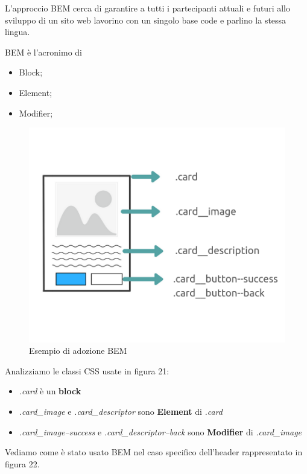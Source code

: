 L'approccio BEM cerca di garantire a tutti i partecipanti attuali e futuri allo sviluppo di un sito web
lavorino con un singolo base code e parlino la stessa lingua. 

BEM è l'acronimo di 
\begin{itemize}
\item Block;
\item Element;
\item Modifier;
\end{itemize}

\begin{figure}[H]
    \centering  
    \caption{Esempio di adozione BEM}
    \includegraphics[scale=0.5]{img/cap3/bem-1}
\end{figure}

Analizziamo le classi CSS usate in figura 21:

\begin{itemize}
    \item \textit{.card} è un \textbf{block}
    \item \textit{.card{\_}image} e  \textit{.card{\_}descriptor} sono \textbf{Element} di \textit{.card}
    \item \textit{.card{\_}image--success} e  \textit{.card{\_}descriptor--back} sono 
    \textbf{Modifier} di \textit{.card{\_}image}
\end{itemize}

Vediamo come è stato usato BEM nel caso specifico dell'header rappresentato in figura 22.

